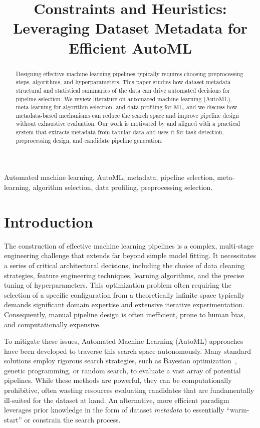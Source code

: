 \documentclass[conference]{IEEEtran}
\title{Constraints and Heuristics: Leveraging Dataset Metadata for Efficient AutoML}
\author{\IEEEauthorblockN{Juli Kyada , Harsh Kakadiya}
   \IEEEauthorblockA{Department of Artificial Intelligence and Machine Learning\\
   Charotar University of Science and Technology, Changa\\
   Email: julikyada293@gmail.com, harshkakadiya128@gmail.com}
   }
\begin{document}
   \maketitle

   \begin{abstract}
   Designing effective machine learning pipelines typically requires choosing preprocessing steps, algorithms, and hyperparameters. This paper studies how dataset metadata structural and statistical summaries of the data can drive automated decisions for pipeline selection. We review literature on automated machine learning (AutoML), meta-learning for algorithm selection, and data profiling for ML, and we discuss how metadata-based mechanisms can reduce the search space and improve pipeline design without exhaustive evaluation. Our work is motivated by and aligned with a practical system that extracts metadata from tabular data and uses it for task detection, preprocessing design, and candidate pipeline generation.
   \end{abstract}

   \begin{IEEEkeywords}
   Automated machine learning, AutoML, metadata, pipeline selection, meta-learning, algorithm selection, data profiling, preprocessing selection.
   \end{IEEEkeywords}

   \section{Introduction}
   \label{sec:intro}

   The construction of effective machine learning pipelines is a complex, multi-stage engineering challenge that extends far beyond simple model fitting. It necessitates a series of critical architectural decisions, including the choice of data cleaning strategies, feature engineering techniques, learning algorithms, and the precise tuning of hyperparameters. This optimization problem often requiring the selection of a specific configuration from a theoretically infinite space typically demands significant domain expertise and extensive iterative experimentation. Consequently, manual pipeline design is often inefficient, prone to human bias, and computationally expensive.

   To mitigate these issues, Automated Machine Learning (AutoML) approaches~\cite{he2021automl} have been developed to traverse this search space autonomously. Many standard solutions employ rigorous search strategies, such as Bayesian optimization~\cite{bergstra2011algorithms}, genetic programming, or random search, to evaluate a vast array of potential pipelines. While these methods are powerful, they can be computationally prohibitive, often wasting resources evaluating candidates that are fundamentally ill-suited for the dataset at hand. An alternative, more efficient paradigm leverages prior knowledge in the form of dataset \emph{metadata} to essentially ``warm-start'' or constrain the search process.
\end{document}
